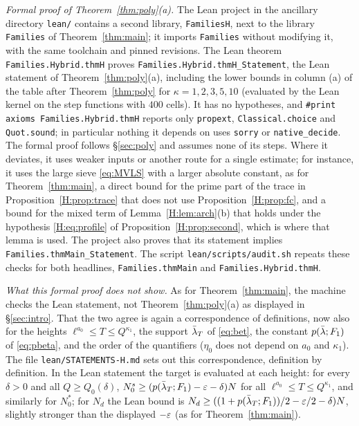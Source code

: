 \documentclass[11pt]{amsart}
\theoremstyle{definition}
\theoremstyle{remark}
\numberwithin{equation}{section}
\begin{document}
\emph{Formal proof of Theorem~\ref{thm:poly}(a).} The Lean project in the ancillary directory \texttt{lean/} contains a second library, \texttt{FamiliesH}, next to the library \texttt{Families} of Theorem~\ref{thm:main}; it imports \texttt{Families} without modifying it, with the same toolchain and pinned revisions. The Lean theorem \texttt{Families.Hybrid.thmH} proves \texttt{Families.Hybrid.thmH\_Statement}, the Lean statement of Theorem~\ref{thm:poly}(a), including the lower bounds in column (a) of the table after Theorem~\ref{thm:poly} for $\kappa=1,2,3,5,10$ (evaluated by the Lean kernel on the step functions with $400$ cells). It has no hypotheses, and \texttt{\#print axioms Families.Hybrid.thmH} reports only \texttt{propext}, \texttt{Classical.choice} and \texttt{Quot.sound}; in particular nothing it depends on uses \texttt{sorry} or \texttt{native\_decide}. The formal proof follows \S\ref{sec:poly} and assumes none of its steps. Where it deviates, it uses weaker inputs or another route for a single estimate; for instance, it uses the large sieve \eqref{eq:MVLS} with a larger absolute constant, as for Theorem~\ref{thm:main}, a direct bound for the prime part of the trace in Proposition~\ref{H:prop:trace} that does not use Proposition~\ref{H:prop:fc}, and a bound for the mixed term of Lemma~\ref{H:lem:arch}(b) that holds under the hypothesis \eqref{H:eq:profile} of Proposition~\ref{H:prop:second}, which is where that lemma is used. The project also proves that its statement implies \texttt{Families.thmMain\_Statement}. The script \texttt{lean/scripts/audit.sh} repeats these checks for both headlines, \texttt{Families.thmMain} and \texttt{Families.Hybrid.thmH}.

\emph{What this formal proof does not show.} As for Theorem~\ref{thm:main}, the machine checks the Lean statement, not Theorem~\ref{thm:poly}(a) as displayed in \S\ref{sec:intro}. That the two agree is again a correspondence of definitions, now also for the heights $\ell^{a_0}\le T\le Q^{\kappa_1}$, the support $\bar\lambda_T$ of \eqref{eq:bet}, the constant $p(\bar\lambda;F_1)$ of \eqref{eq:pbeta}, and the order of the quantifiers ($\eta_0$ does not depend on $a_0$ and $\kappa_1$). The file \texttt{lean/STATEMENTS-H.md} sets out this correspondence, definition by definition. In the Lean statement the target is evaluated at each height: for every $\delta>0$ and all $Q\ge Q_0(\delta)$, $N^s_0\ge(p(\bar\lambda_T;F_1)-\varepsilon-\delta)N$ for all $\ell^{a_0}\le T\le Q^{\kappa_1}$, and similarly for $N^*_0$; for $N_d$ the Lean bound is $N_d\ge((1+p(\bar\lambda_T;F_1))/2-\varepsilon/2-\delta)N$, slightly stronger than the displayed $-\varepsilon$ (as for Theorem~\ref{thm:main}).
\end{document}
